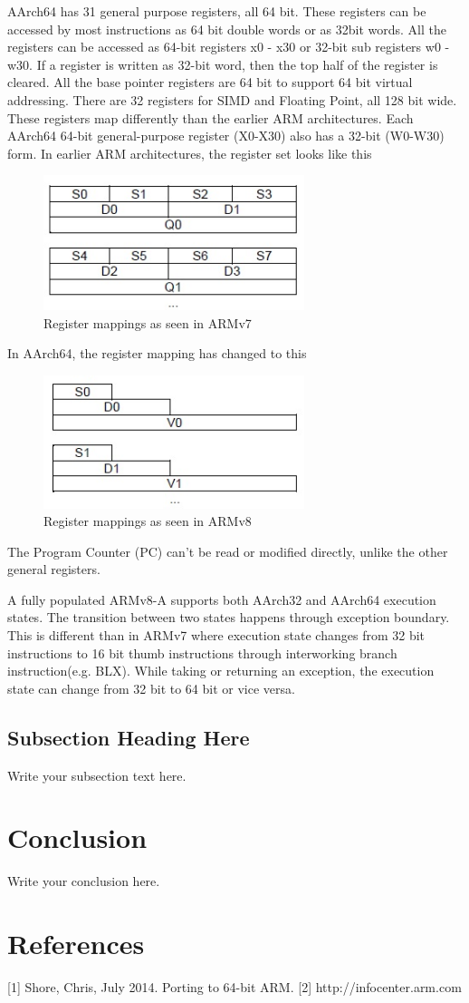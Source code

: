 \documentclass[journal]{IEEEtran}
\begin{document}
AArch64 has 31 general purpose registers, all 64 bit.  These registers can be accessed by most instructions as 64 bit double words or as 32bit words.  All the registers can be accessed as 64-bit registers x0 - x30 or 32-bit sub registers w0 - w30.  If a register is written as 32-bit word, then the top half of the register is cleared.  All the base pointer registers are 64 bit to support 64 bit virtual addressing.  There are 32 registers for SIMD and Floating Point, all 128 bit wide.  These registers map differently than the earlier ARM architectures. Each AArch64 64-bit general-purpose register (X0-X30) also has a 32-bit (W0-W30) form.
In earlier ARM architectures, the register set looks like this
\begin{figure}
    \centering
    \includegraphics[width=3.0in]{./figures/oldReg}
    \caption{Register mappings as seen in ARMv7}
    \label{oldRegfigure}
\end{figure}

In AArch64, the register mapping has changed to this

\begin{figure}
    \centering
    \includegraphics[width=3.0in]{./figures/newReg}
    \caption{Register mappings as seen in ARMv8}
    \label{newRegfigure}
\end{figure}


The Program Counter (PC) can't be read or modified directly, unlike the other general registers.

A fully populated ARMv8-A supports both AArch32 and AArch64 execution states. The transition between two states happens through exception boundary.  This is different than in ARMv7 where execution state changes from 32 bit instructions to 16 bit thumb instructions through interworking branch instruction(e.g. BLX). While taking or returning an exception, the execution state can change from 32 bit to 64 bit or vice versa.

\subsection{Subsection Heading Here}
Write your subsection text here.

\section{Conclusion}
Write your conclusion here.

\section{References}
[1] Shore, Chris, July 2014. Porting to 64-bit ARM.
[2] http://infocenter.arm.com 
\end{document}

